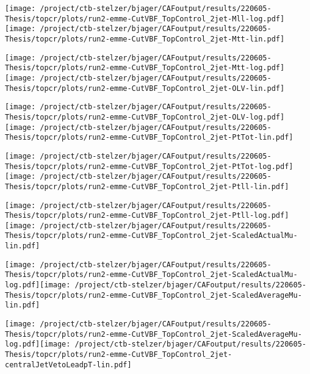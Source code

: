 \documentclass{article}
\begin{document}
\texttt{[image: /project/ctb-stelzer/bjager/CAFoutput/results/220605-Thesis/topcr/plots/run2-emme-CutVBF\_TopControl\_2jet-Mll-log.pdf]}\texttt{[image: /project/ctb-stelzer/bjager/CAFoutput/results/220605-Thesis/topcr/plots/run2-emme-CutVBF\_TopControl\_2jet-Mtt-lin.pdf]}

\texttt{[image: /project/ctb-stelzer/bjager/CAFoutput/results/220605-Thesis/topcr/plots/run2-emme-CutVBF\_TopControl\_2jet-Mtt-log.pdf]}\texttt{[image: /project/ctb-stelzer/bjager/CAFoutput/results/220605-Thesis/topcr/plots/run2-emme-CutVBF\_TopControl\_2jet-OLV-lin.pdf]}

\texttt{[image: /project/ctb-stelzer/bjager/CAFoutput/results/220605-Thesis/topcr/plots/run2-emme-CutVBF\_TopControl\_2jet-OLV-log.pdf]}\texttt{[image: /project/ctb-stelzer/bjager/CAFoutput/results/220605-Thesis/topcr/plots/run2-emme-CutVBF\_TopControl\_2jet-PtTot-lin.pdf]}

\texttt{[image: /project/ctb-stelzer/bjager/CAFoutput/results/220605-Thesis/topcr/plots/run2-emme-CutVBF\_TopControl\_2jet-PtTot-log.pdf]}\texttt{[image: /project/ctb-stelzer/bjager/CAFoutput/results/220605-Thesis/topcr/plots/run2-emme-CutVBF\_TopControl\_2jet-Ptll-lin.pdf]}

\texttt{[image: /project/ctb-stelzer/bjager/CAFoutput/results/220605-Thesis/topcr/plots/run2-emme-CutVBF\_TopControl\_2jet-Ptll-log.pdf]}\texttt{[image: /project/ctb-stelzer/bjager/CAFoutput/results/220605-Thesis/topcr/plots/run2-emme-CutVBF\_TopControl\_2jet-ScaledActualMu-lin.pdf]}

\texttt{[image: /project/ctb-stelzer/bjager/CAFoutput/results/220605-Thesis/topcr/plots/run2-emme-CutVBF\_TopControl\_2jet-ScaledActualMu-log.pdf]}\texttt{[image: /project/ctb-stelzer/bjager/CAFoutput/results/220605-Thesis/topcr/plots/run2-emme-CutVBF\_TopControl\_2jet-ScaledAverageMu-lin.pdf]}

\texttt{[image: /project/ctb-stelzer/bjager/CAFoutput/results/220605-Thesis/topcr/plots/run2-emme-CutVBF\_TopControl\_2jet-ScaledAverageMu-log.pdf]}\texttt{[image: /project/ctb-stelzer/bjager/CAFoutput/results/220605-Thesis/topcr/plots/run2-emme-CutVBF\_TopControl\_2jet-centralJetVetoLeadpT-lin.pdf]}
\end{document}
